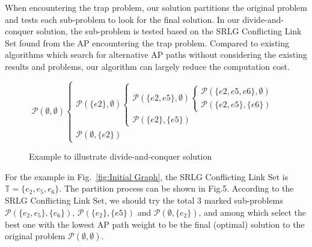 When encountering the trap problem, our solution partitions the original problem and tests each sub-problem to look for the final solution. In our divide-and-conquer solution, the sub-problem is tested based on the SRLG Conflicting Link Set found from the AP encountering the trap problem. Compared to existing algorithms which search for alternative AP paths without considering the existing results and problems, our algorithm can largely reduce the computation cost.
\begin{figure}[tp]
\label{fig:DividedConquer}

\tiny{
\begin{equation*}
{\mathcal P}(\emptyset ,\emptyset )\left\{ {\begin{array}{*{20}{l}}
{{\mathcal P}(\{ e2\} ,\emptyset )\left\{ {\begin{array}{*{20}{l}}
{{\mathcal P}(\{ e2,e5\} ,\emptyset )\left\{ {\begin{array}{*{20}{l}}
{{\mathcal P}(\{ e2,e5,e6\} ,\emptyset )}\\
{\boxed{{\mathcal P}(\{ e2,e5\} ,\{ e6\} )}}
\end{array}} \right.}\\
{\boxed{{\mathcal P}(\{ e2\} ,\{ e5\} )}}
\end{array}} \right.}\\
{\boxed{{\mathcal P}(\emptyset ,\{ e2\} )}}
\end{array}} \right.
\end{equation*}
}
\caption{Example to illustrate divide-and-conquer solution}
\end{figure}
For the example in Fig.~\ref{fig:Initial Graph}, the SRLG Conflicting Link Set is $\mathbb{T}=\{e_2,e_5,e_6\}$.  The partition process can be shown in Fig.5.  According to the SRLG Conflicting Link Set, we should try the total $3$ marked sub-problems ${{\mathcal{P}}(\{ e_2,e_5\} ,\{ e_6\} )}$, ${{\mathcal{P}}(\{ e_2\} ,\{ e5\} )}$ and ${{\mathcal{P}}(\emptyset ,\{ e_2\} )}$,  and among which select the best one with the lowest AP path weight to be the final (optimal) solution to the original problem  $\mathcal{P}(\emptyset,\emptyset)$.


